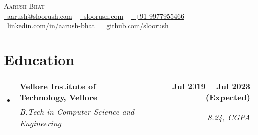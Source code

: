 \documentclass[a4paper,11pt]{article}
\makeatletter
\newcommand{\resumeSubheading}[4]{
  \vspace{-2pt}\item
    \begin{tabular*}{1.0\textwidth}[t]{l@{\extracolsep{\fill}}r}
      \textbf{#1} & \textbf{\small #2} \\
      \textit{\small#3} & \textit{\small #4} \\
    \end{tabular*}\vspace{-7pt}
}
\newcommand{\resumeSubHeadingListStart}{\begin{itemize}[leftmargin=0.0in, label={}]}
\newcommand{\resumeSubHeadingListEnd}{\end{itemize}}
\makeatother
\begin{document}

\begin{center}
    {\Huge \scshape Aarush Bhat} \\ \vspace{8pt}
    \small 
    \href{mailto:aarush@sloorush.com}{\raisebox{-0.2\height}\faEnvelope\  \underline{aarush@sloorush.com}} ~ 
    \href{https://sloorush.com}{\raisebox{-0.2\height}\faLink\   \underline{sloorush.com}} ~
    \href{tel://+919977955466}{\raisebox{-0.2\height}\faPhone\   \underline{+91 9977955466}} ~
    \href{https://linkedin.com/in/aarush-bhat/}{\raisebox{-0.2\height}\faLinkedin\ \underline{linkedin.com/in/aarush-bhat}}  ~
    \href{https://github.com/sloorush}{\raisebox{-0.2\height}\faGithub\ \underline{github.com/sloorush}}
    \vspace{-8pt}
\end{center}


\section{Education}
  \resumeSubHeadingListStart
    \resumeSubheading
      {Vellore Institute of Technology, Vellore}{Jul 2019 -- Jul 2023 (Expected)}
      {B.Tech in Computer Science and Engineering}{8.24, CGPA}
  \resumeSubHeadingListEnd
  
\end{document}

